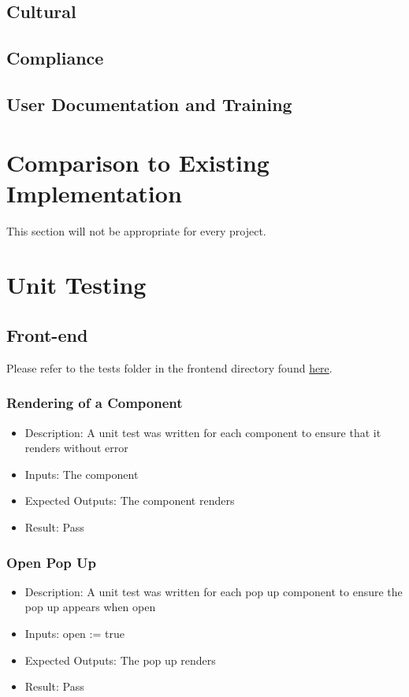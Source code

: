 \documentclass[12pt, titlepage]{article}
\begin{document}
\subsection{Cultural}
\subsection{Compliance}
\subsection{User Documentation and Training}


	
\section{Comparison to Existing Implementation}	

This section will not be appropriate for every project.

\section{Unit Testing}
\subsection{Front-end}
Please refer to the tests folder in the frontend directory found \href{https://github.com/OKKM-insights/frontend/tree/main/tests/__tests__}{here}.
\subsubsection{Rendering of a Component}
\begin{itemize}
    \item Description: A unit test was written for each component to ensure that it renders without error
    \item Inputs: The component
    \item Expected Outputs: The component renders 
    \item Result: Pass
\end{itemize}
\subsubsection{Open Pop Up}
\begin{itemize}
    \item Description: A unit test was written for each pop up component to ensure the pop up appears when open
    \item Inputs: open := true
    \item Expected Outputs: The pop up renders 
    \item Result: Pass
\end{itemize}
\end{document}
